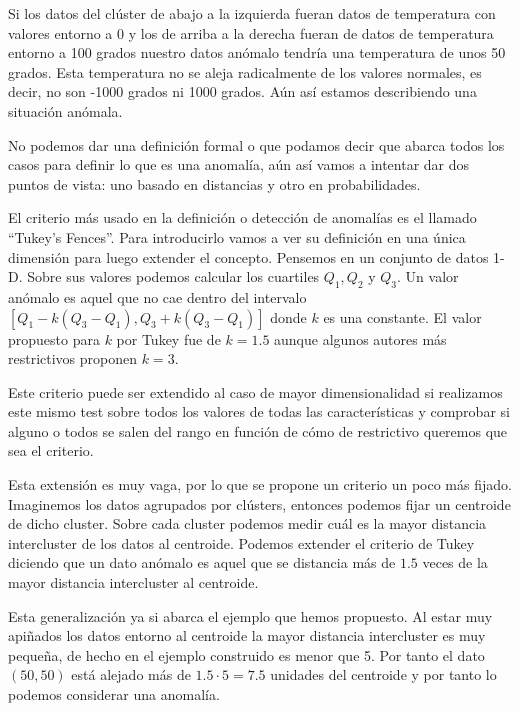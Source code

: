 Si los datos del clúster de abajo a la izquierda fueran datos de temperatura con valores entorno a 0 y los de arriba a la derecha fueran de datos de temperatura entorno a 100 grados nuestro datos anómalo tendría una temperatura de unos 50 grados. Esta temperatura no se aleja radicalmente de los valores normales, es decir, no son -1000 grados ni 1000 grados. Aún así estamos describiendo una situación anómala.

No podemos dar una definición formal o que podamos decir que abarca todos los casos para definir lo que es una anomalía, aún así vamos a intentar dar dos puntos de vista: uno basado en distancias y otro en probabilidades.

El criterio más usado en la definición o detección de anomalías es el llamado ``Tukey's Fences''. Para introducirlo vamos a ver su definición en una única dimensión para luego extender el concepto. Pensemos en un conjunto de datos 1-D. Sobre sus valores podemos calcular los cuartiles $Q_1 , Q_2 $ y $Q_3$. Un valor anómalo es aquel que no cae dentro del intervalo $[Q_1 - k(Q_3 - Q_1), Q_3 + k(Q_3 - Q_1)]$ donde $k$ es una constante. El valor propuesto para $k$ por Tukey fue de $k=1.5$ aunque algunos autores más restrictivos proponen $k=3$.

Este criterio puede ser extendido al caso de mayor dimensionalidad si realizamos este mismo test sobre todos los valores de todas las características y comprobar si alguno o todos se salen del rango en función de cómo de restrictivo queremos que sea el criterio.

Esta extensión es muy vaga, por lo que se propone un criterio un poco más fijado. Imaginemos los datos agrupados por clústers, entonces podemos fijar un centroide de dicho cluster. Sobre cada cluster podemos medir cuál es la mayor distancia intercluster de los datos al centroide. Podemos extender el criterio de Tukey diciendo que un dato anómalo es aquel que se distancia más de $1.5$ veces de la mayor distancia intercluster al centroide.

Esta generalización ya si abarca el ejemplo que hemos propuesto. Al estar muy apiñados los datos entorno al centroide la mayor distancia intercluster es muy pequeña, de hecho en el ejemplo construido es menor que 5. Por tanto el dato $(50,50)$ está alejado más de $1.5 \cdot 5 = 7.5$ unidades del centroide y por tanto lo podemos considerar una anomalía.